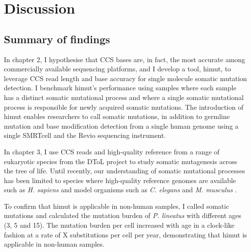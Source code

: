 \chapter{Discussion}

\ifpdf
    \graphicspath{{Chapter4/Figs/Raster/}{Chapter4/Figs/PDF/}{Chapter4/Figs/}}
\else
    \graphicspath{{Chapter4/Figs/Vector/}{Chapter4/Figs/}}
\fi

\section{Summary of findings}

In chapter 2, I hypothesise that CCS bases are, in fact, the most accurate among commercially available sequencing platforms, and I develop a tool, himut, to leverage CCS read length and base accuracy for single molecule somatic mutation detection. I benchmark himut’s performance using samples where each sample has a distinct somatic mutational process and where a single somatic mutational process is responsible for newly acquired somatic mutations. The introduction of himut enables researchers to call somatic mutations, in addition to germline mutation and base modification detection from a single human genome using a single SMRTcell and the Revio sequencing instrument. 
 
In chapter 3, I use CCS reads and high-quality reference from a range of eukaryotic species from the DToL project to study somatic mutagenesis across the tree of life. Until recently, our understanding of somatic mutational processes has been limited to species where high-quality reference genomes are available such as \textit{H. sapiens} and model organisms such as \textit{C. elegans} \cite{} and \textit{M. musculus} \cite{}. 
 
To confirm that himut is applicable in non-human samples, I called somatic mutations and calculated the mutation burden of \textit{P. lineatus} with different ages (3, 5 and 15). The mutation burden per cell increased with age in a clock-like fashion at a rate of X substitutions per cell per year, demonstrating that himut is applicable in non-human samples. 
 
